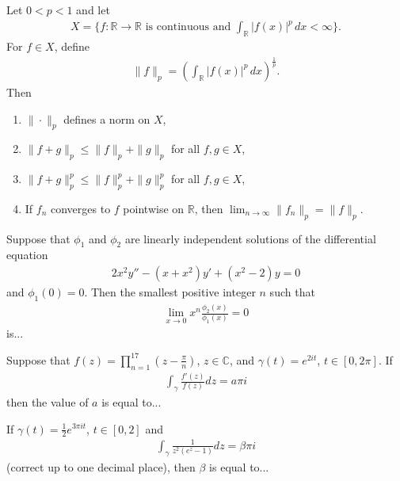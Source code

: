 \iffalse
\author{EE24BTECH11047}
\section{ma}
\chapter{2020}
\fi
\item Let \(0 < p < 1\) and let 
\begin{align*}
    X = \{ f : \mathbb{R} \rightarrow \mathbb{R} \text{ is continuous and } \int_{\mathbb{R}} |f(x)|^p \, dx < \infty \}.
\end{align*}
For \(f \in X\), define 
\begin{align*}
   \|f\|_p = \left(\int_{\mathbb{R}} |f(x)|^p \, dx\right)^{\frac{1}{p}}. 
\end{align*}
Then 
\begin{enumerate}
    \item \(\|\cdot\|_p\) defines a norm on \(X\),
    \item \(\|f + g\|_p \leq \|f\|_p + \|g\|_p\) for all \(f, g \in X\),
    \item \(\|f + g\|_p^p \leq \|f\|_p^p + \|g\|_p^p\) for all \(f, g \in X\),
    \item If \(f_n\) converges to \(f\) pointwise on \(\mathbb{R}\), then \(\lim_{n \rightarrow \infty} \|f_n\|_p = \|f\|_p\).
\end{enumerate}

\item Suppose that \(\phi_1\) and \(\phi_2\) are linearly independent solutions of the differential equation
\begin{align*}
   2x^2y'' - (x + x^2)y' + (x^2 - 2)y = 0 
\end{align*}
and \(\phi_1(0) = 0\). Then the smallest positive integer \(n\) such that
\begin{align*}
    \lim_{x \rightarrow 0} x^n \frac{\phi_2(x)}{\phi_1(x)} = 0
\end{align*}
is...

\item Suppose that \(f(z) = \prod_{n=1}^{17} (z - \frac{\pi}{n})\), \(z \in \mathbb{C}\), and \(\gamma(t) = e^{2it}\), \(t \in [0, 2\pi]\). If
\begin{align*}
\int_{\gamma} \frac{f'(z)}{f(z)} dz = a\pi i    
\end{align*}
then the value of \(a\) is equal to...

\item If \(\gamma(t) = \frac{1}{2} e^{3\pi i t}\), \(t \in [0, 2]\) and
\begin{align*}
    \int_{\gamma} \frac{1}{z^2(e^z - 1)} dz = \beta \pi i
\end{align*}
(correct up to one decimal place), then \(\beta\) is equal to...

